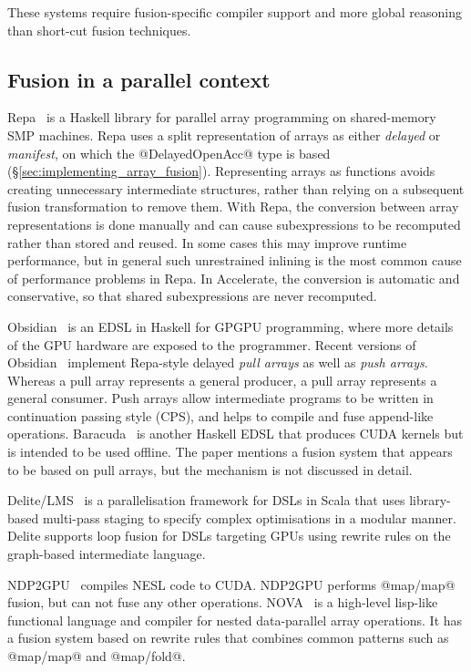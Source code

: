These systems require fusion-specific compiler support and more global reasoning
than short-cut fusion techniques.


\subsection{Fusion in a parallel context}

Repa~\cite{Keller:2010er} is a Haskell library for parallel array programming on
shared-memory SMP machines. Repa uses a split
representation of arrays as either \emph{delayed} or \emph{manifest}, on which
the @DelayedOpenAcc@ type is based (\S\ref{sec:implementing_array_fusion}).
Representing arrays as functions avoids creating unnecessary intermediate
structures, rather than relying on a subsequent fusion transformation to remove
them. With Repa, the conversion between array representations is done manually
and can cause subexpressions to be recomputed rather than stored and reused. In
some cases this may improve runtime performance, but in general such
unrestrained inlining is the most common cause of performance problems in Repa.
In Accelerate, the conversion is automatic and conservative, so that shared
subexpressions are never recomputed.

Obsidian~\cite{Svensson:2008a} is an EDSL in Haskell for GPGPU programming,
where more details of the GPU hardware are exposed to the programmer. Recent
versions of Obsidian~\cite{Claessen:2012hl} implement Repa-style delayed
\emph{pull arrays} as well as \emph{push
arrays}. Whereas a pull array represents a general
producer, a pull array represents a general consumer. Push arrays allow
intermediate programs to be written in continuation passing style
(CPS), and helps to compile and fuse append-like operations.
Baracuda~\cite{Larsen:2011fa} is another Haskell EDSL that produces CUDA kernels
but is intended to be used offline. The paper mentions a fusion system that
appears to be based on pull arrays, but the mechanism is not discussed in
detail.

Delite/LMS~\cite{Rompf:2013er} is a parallelisation framework for DSLs in Scala
that uses library-based multi-pass staging to specify complex optimisations in a
modular manner. Delite supports loop fusion for DSLs targeting GPUs using
rewrite rules on the graph-based intermediate language.

NDP2GPU~\cite{Bergstrom:2012bi} compiles NESL code to CUDA. NDP2GPU performs
@map/map@ fusion, but can not fuse any other operations.
NOVA~\cite{Collins:2013wn} is a high-level lisp-like functional language and
compiler for nested data-parallel array operations. It has a fusion system based
on rewrite rules that combines common patterns such as @map/map@ and @map/fold@.

